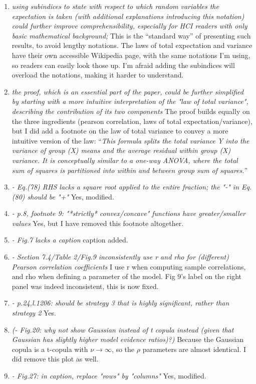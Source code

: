 \documentclass{article}
\begin{document}
\begin{enumerate}
    \item \textit{using subindices to state with respect to which random variables the expectation is taken (with additional explanations introducing this notation) could further improve comprehensibility, especially for HCI readers with only basic mathematical background;} This is the ``standard way'' of presenting such results, to avoid lengthy notations. The laws of total expectation and variance have their own accessible Wikipedia page, with the same notations I'm using, so readers can easily look those up. I'm afraid adding the subindices will overload the notations, making it harder to understand.
    \item \textit{the proof, which is an essential part of the paper, could be further simplified by starting with a more intuitive interpretation of the "law of total variance", describing the contribution of its two components} The proof builds equally on the three ingredients (pearson correlation, laws of total expectation/variance), but I did add a footnote on the law of total variance to convey a more intuitive version of the law: ``\textit{This formula splits the total variance Y into the variance of group (X) means and the average residual within group (X) variance. It is conceptually similar to a one-way ANOVA, where the total sum of squares is partitioned into within and between group sum of squares.}''
    \item \textit{- Eq.(78) RHS lacks a square root applied to the entire fraction; the "-" in Eq.(80) should be "+"} Yes, modified.
    \item \textit{- p.8, footnote 9: "*strictly* convex/concave" functions have greater/smaller values} Yes, but I have removed this footnote altogether.
    \item \textit{- Fig.7 lacks a caption} caption added.
    \item \textit{- Section 7.4/Table 2/Fig.9 inconsistently use r and rho for (different) Pearson correlation coefficients} I use r when computing sample correlations, and rho when defining a parameter of the model. Fig 9's label on the right panel was indeed inconsistent, this is now fixed.
    \item \textit{- p.24,l.1206: should be strategy 3 that is highly significant, rather than strategy 2} Yes.
    \item \textit{(- Fig.20: why not show Gaussian instead of t copula instead (given that Gaussian has slightly higher model evidence ratios)?)} Because the Gaussian copula is a t-copula with $\nu \to \infty$, so the $\rho$ parameters are almost identical. I did remove this plot as well.
    \item \textit{- Fig.27: in caption, replace "rows" by "columns"} Yes, modified.
\end{enumerate}
\end{document}
